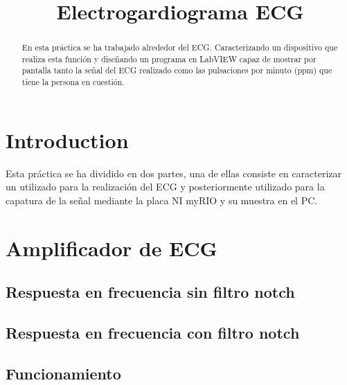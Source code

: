 \documentclass[conference]{IEEEtran}
\begin{document}
\title{Electrogardiograma ECG}

\author{
\and
{}
}

\maketitle

\begin{abstract}
En esta práctica se ha trabajado alrededor del ECG. Caracterizando un dispositivo que realiza esta función y diseñando un programa en LabVIEW capaz de mostrar por pantalla tanto la señal del ECG realizado como las pulsaciones por minuto (ppm) que tiene la persona en cuestión.
\end{abstract}

\section{Introduction}
Esta práctica se ha dividido en dos partes, una de ellas consiste en caracterizar un utilizado para la realización del ECG y posteriormente utilizado para la capatura de la señal mediante la placa NI myRIO y su muestra en el PC.

\section{Amplificador de ECG}
\subsection{Respuesta en frecuencia sin filtro notch}

\subsection{Respuesta en frecuencia con filtro notch}

\subsection{Funcionamiento}
\end{document}
